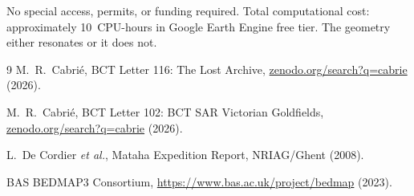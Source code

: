 \documentclass[12pt,twocolumn]{article}
\begin{document}
No special access, permits, or funding required. Total
computational cost: approximately 10~CPU-hours in Google
Earth Engine free tier. The geometry either resonates
or it does not.

\begin{thebibliography}{9}
 M.~R.~Cabri\'{e},
BCT Letter 116: The Lost Archive,
\href{https://zenodo.org/search?q=cabrie}
{zenodo.org/search?q=cabrie} (2026).

 M.~R.~Cabri\'{e},
BCT Letter 102: BCT SAR Victorian Goldfields,
\href{https://zenodo.org/search?q=cabrie}
{zenodo.org/search?q=cabrie} (2026).

 L.~De Cordier \textit{et al.},
Mataha Expedition Report, NRIAG/Ghent (2008).

 BAS BEDMAP3 Consortium,
\url{https://www.bas.ac.uk/project/bedmap} (2023).
\end{thebibliography}
\end{document}

